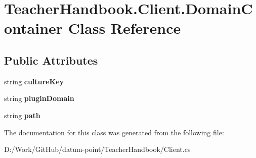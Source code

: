 \hypertarget{class_teacher_handbook_1_1_client_1_1_domain_container}{}\section{Teacher\+Handbook.\+Client.\+Domain\+Container Class Reference}
\label{class_teacher_handbook_1_1_client_1_1_domain_container}
\subsection*{Public Attributes}
\begin{DoxyCompactItemize}
\item 
\mbox{\label{class_teacher_handbook_1_1_client_1_1_domain_container_ae72edd58099a7ac8a146367a71b75d3e}} 
string {\bfseries culture\+Key}
\item 
\mbox{\label{class_teacher_handbook_1_1_client_1_1_domain_container_a369aa498ee2cf929f7b93dd02d70e2d2}} 
string {\bfseries plugin\+Domain}
\item 
\mbox{\label{class_teacher_handbook_1_1_client_1_1_domain_container_ac7941ee0cc4a0a462939c719e2b21c4d}} 
string {\bfseries path}
\end{DoxyCompactItemize}


The documentation for this class was generated from the following file\+:\begin{DoxyCompactItemize}
\item 
D\+:/\+Work/\+Git\+Hub/datum-\/point/\+Teacher\+Handbook/Client.\+cs\end{DoxyCompactItemize}
